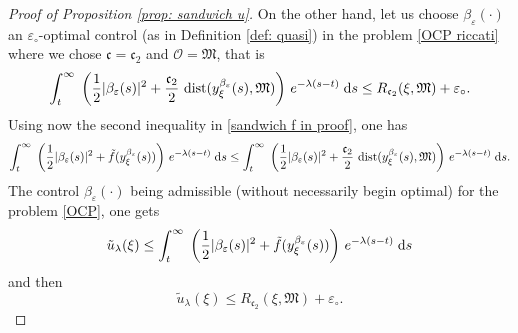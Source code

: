 \documentclass[10pt,a4paper]{amsart}
\newcommand{\D}[1]{\mbox{\rm #1}}
\newcommand{\dd}{\D{d}}
\begin{document}
\begin{proof}[Proof of Proposition \ref{prop: sandwich u}]
On the other hand, let us choose $\beta_{\varepsilon}(\cdot)$ an  $\varepsilon_{\circ}$-optimal control (as in Definition \ref{def: quasi}) in the problem \eqref{OCP riccati} where we chose $\mathfrak{c}=\mathfrak{c}_{2}$ and $\mathscr{O}=\mathfrak{M}$, that is
\begin{equation*}
    \int_{t}^{\infty}\; \left(\frac{1}{2}|\beta_{\varepsilon}(s)|^{2} + \frac{\mathfrak{c}_{2}}{2}\,\operatorname{dist}(y_{\xi}^{\beta_{\varepsilon}}(s),\mathfrak{M})\right)\, e^{-\lambda (s-t)}\;\dd s \leq R_{\mathfrak{c}_{2}}(\xi, \mathfrak{M}) + \varepsilon_{\circ}.
\end{equation*}
Using now the second inequality in \eqref{sandwich f in proof}, one has
\begin{equation*}
    \int_{t}^{\infty}\; \left(\frac{1}{2}|\beta_{\varepsilon}(s)|^{2} + \tilde{f}(y_{\xi}^{\beta_{\varepsilon}}(s))\right)\, e^{-\lambda (s-t)}\;\dd s
    \leq 
    \int_{t}^{\infty}\; \left(\frac{1}{2}|\beta_{\varepsilon}(s)|^{2} + \frac{\mathfrak{c}_{2}}{2}\,\operatorname{dist}(y_{\xi}^{\beta_{\varepsilon}}(s),\mathfrak{M})\right)\, e^{-\lambda (s-t)}\;\dd s.
\end{equation*}
The control $\beta_{\varepsilon}(\cdot)$ being admissible (without necessarily begin optimal) for the problem \eqref{OCP}, one gets
\begin{equation*}
    \tilde{u}_{\lambda}(\xi)
    \leq 
    \int_{t}^{\infty}\; \left(\frac{1}{2}|\beta_{\varepsilon}(s)|^{2} + \tilde{f}(y_{\xi}^{\beta_{\varepsilon}}(s))\right)\, e^{-\lambda (s-t)}\;\dd s
\end{equation*}
and then
\begin{equation}\label{eq: up R}
    \tilde{u}_{\lambda}(\xi)
    \leq 
    R_{\mathfrak{c}_{2}}(\xi, \mathfrak{M}) + \varepsilon_{\circ}.
\end{equation}


\end{proof}
\end{document}
